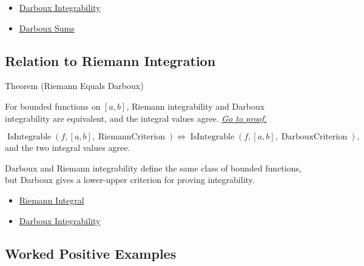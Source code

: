 \begin{dependencies}
\begin{itemize}
  \item \hyperref[def:darboux-integrability]{Darboux Integrability}
  \item \hyperref[def:darboux-sums]{Darboux Sums}
\end{itemize}
\end{dependencies}



\subsection*{Relation to Riemann Integration}

\begin{theorembox}{Theorem (Riemann Equals Darboux)}
\begin{theorem}
\label{thm:riemann-darboux-equivalence}
For bounded functions on \([a,b]\), Riemann integrability and Darboux
integrability are equivalent, and the integral values agree.
\hyperref[prf:riemann-darboux-equivalence]{\textit{Go to proof.}}
\end{theorem}
\end{theorembox}

\begin{remark*}
\[
\operatorname{IsIntegrable}(f,[a,b],\operatorname{RiemannCriterion})
\Longleftrightarrow
\operatorname{IsIntegrable}(f,[a,b],\operatorname{DarbouxCriterion}),
\]
and the two integral values agree.
\end{remark*}

\begin{remark*}[Interpretation]
Darboux and Riemann integrability define the same class of bounded functions,
but Darboux gives a lower-upper criterion for proving integrability.
\end{remark*}

\begin{dependencies}
\begin{itemize}
  \item \hyperref[def:riemann-integral]{Riemann Integral}
  \item \hyperref[def:darboux-integrability]{Darboux Integrability}
\end{itemize}
\end{dependencies}

\subsection*{Worked Positive Examples}

